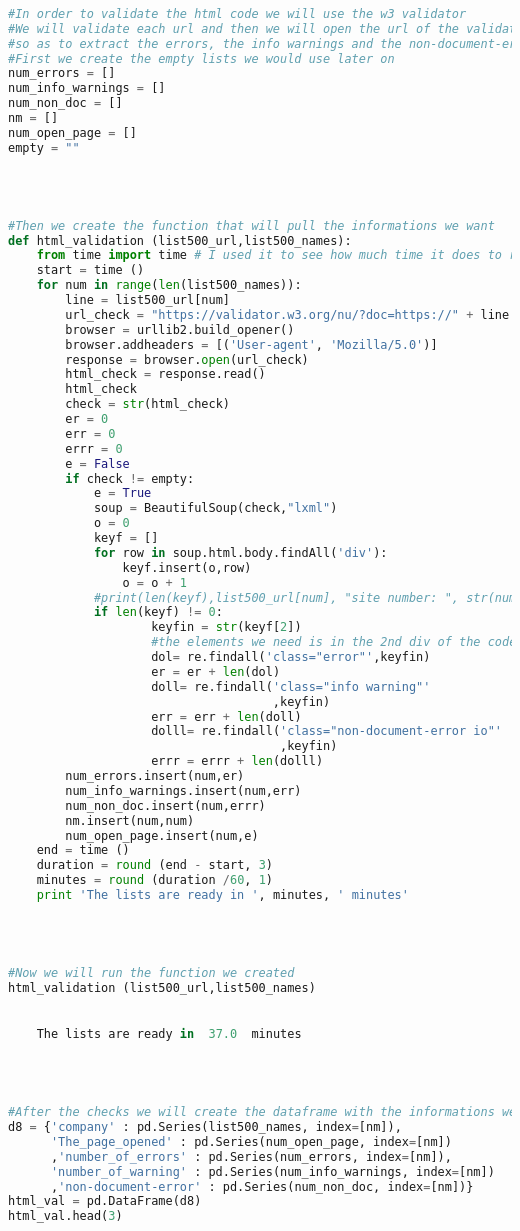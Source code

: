 \documentclass{article}
\begin{document}
\begin{lstlisting}[language=Python]
 
#In order to validate the html code we will use the w3 validator
#We will validate each url and then we will open the url of the validation page
#so as to extract the errors, the info warnings and the non-document-error io informations 
#First we create the empty lists we would use later on
num_errors = []
num_info_warnings = []
num_non_doc = [] 
nm = []
num_open_page = []
empty = ""
 


 
#Then we create the function that will pull the informations we want
def html_validation (list500_url,list500_names):
    from time import time # I used it to see how much time it does to run the function
    start = time ()
    for num in range(len(list500_names)):
        line = list500_url[num] 
        url_check = "https://validator.w3.org/nu/?doc=https://" + line
        browser = urllib2.build_opener()
        browser.addheaders = [('User-agent', 'Mozilla/5.0')]
        response = browser.open(url_check)
        html_check = response.read()
        html_check
        check = str(html_check)
        er = 0
        err = 0
        errr = 0
        e = False
        if check != empty:
            e = True
            soup = BeautifulSoup(check,"lxml")
            o = 0
            keyf = []
            for row in soup.html.body.findAll('div'):
                keyf.insert(o,row)
                o = o + 1
            #print(len(keyf),list500_url[num], "site number: ", str(num))        
            if len(keyf) != 0:       
                    keyfin = str(keyf[2]) 
                    #the elements we need is in the 2nd div of the code
                    dol= re.findall('class="error"',keyfin)            
                    er = er + len(dol)
                    doll= re.findall('class="info warning"'
                                     ,keyfin)            
                    err = err + len(doll)
                    dolll= re.findall('class="non-document-error io"'
                                      ,keyfin)            
                    errr = errr + len(dolll)
        num_errors.insert(num,er)
        num_info_warnings.insert(num,err)
        num_non_doc.insert(num,errr)  
        nm.insert(num,num) 
        num_open_page.insert(num,e)
    end = time ()
    duration = round (end - start, 3)
    minutes = round (duration /60, 1)
    print 'The lists are ready in ', minutes, ' minutes'
 


 
#Now we will run the function we created
html_validation (list500_url,list500_names)
 

    The lists are ready in  37.0  minutes
    


 
#After the checks we will create the dataframe with the informations we want
d8 = {'company' : pd.Series(list500_names, index=[nm]),
      'The_page_opened' : pd.Series(num_open_page, index=[nm])
      ,'number_of_errors' : pd.Series(num_errors, index=[nm]),
      'number_of_warning' : pd.Series(num_info_warnings, index=[nm])
      ,'non-document-error' : pd.Series(num_non_doc, index=[nm])}
html_val = pd.DataFrame(d8)    
html_val.head(3) 
\end{lstlisting}
\end{document}
